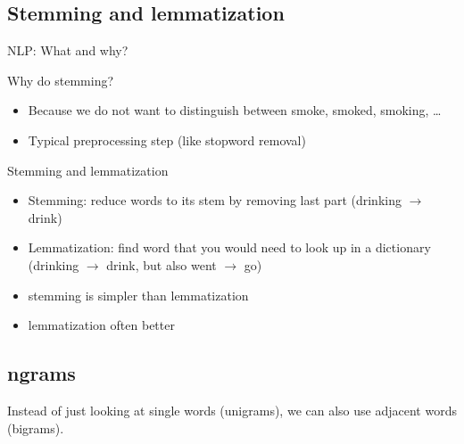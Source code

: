 \documentclass[handout]{beamer}
\begin{document}
\subsection{Stemming and lemmatization}


\begin{frame}{NLP: What and why?}
	\begin{block}{Why do stemming?}
		\begin{itemize}
			\item Because we do not want to distinguish between smoke, smoked, smoking, \ldots
			\item Typical preprocessing step (like stopword removal)
		\end{itemize}
	\end{block}
\end{frame}

\begin{frame}[fragile]{Stemming and lemmatization}
	\begin{itemize}
		\item Stemming: reduce words to its stem by removing last part (drinking $\rightarrow$ drink)
		\item Lemmatization: find word that you would need to look up in a dictionary (drinking $\rightarrow$ drink, but also went $\rightarrow$ go)
		\item stemming is simpler than lemmatization
		\item lemmatization often better
	\end{itemize}
\end{frame}
	


\subsection{ngrams}
\begin{frame}
	Instead of just looking at single words (unigrams), we can also use adjacent words (bigrams).
\end{frame}
\end{document}
